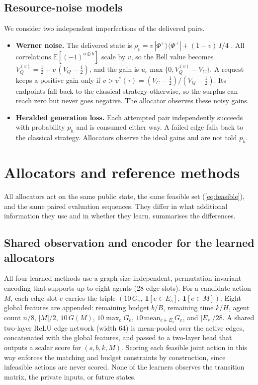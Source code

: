 \documentclass[11pt,a4paper]{article}
\newcommand{\xor}{\mathbin{\oplus}}
\newcommand{\E}{\mathbb{E}}
\begin{document}
\subsection{Resource-noise models}\label{sec:noise-model}

We consider two independent imperfections of the delivered pairs.
\begin{itemize}[leftmargin=*]
  \item \textbf{Werner noise.} The delivered state is $\rho_v=v\,|\Phi^+\rangle\langle\Phi^+|+(1-v)\,I/4$ \cite{werner1989quantum}. All correlations $\E[(-1)^{a\xor b}]$ scale by $v$, so the Bell value becomes $V_Q^{(v)}=\tfrac12+v\,(V_Q-\tfrac12)$, and the gain is $u_e\max\{0,V_Q^{(v)}-V_C\}$. A request keeps a positive gain only if $v>v^*(\tau)=(V_C-\tfrac12)/(V_Q-\tfrac12)$. Its endpoints fall back to the classical strategy otherwise, so the surplus can reach zero but never goes negative. The allocator observes these noisy gains.
  \item \textbf{Heralded generation loss.} Each attempted pair independently succeeds with probability $p_h$ and is consumed either way. A failed edge falls back to the classical strategy. Allocators observe the ideal gains and are not told $p_h$.
\end{itemize}

\section{Allocators and reference methods}\label{sec:methods}

All allocators act on the same public state, the same feasible set (\cref{eq:feasible}), and the same paired evaluation sequences. They differ in what additional information they use and in whether they learn.  summarises the differences.

\subsection{Shared observation and encoder for the learned allocators}\label{sec:features}

All four learned methods use a graph-size-independent, permutation-invariant encoding \cite{zaheer2017deep} that supports up to eight agents (28 edge slots). For a candidate action $M$, each edge slot $e$ carries the triple $(10\,G_e,\ \mathbf{1}[e\in E_{s}],\ \mathbf{1}[e\in M])$. Eight global features are appended: remaining budget $b/B$, remaining time $k/H$, agent count $n/8$, $|M|/2$, $10\,G(M)$, $10\max_{e}G_e$, $10\,\mathrm{mean}_{e\in E_s}G_e$, and $|E_s|/28$. A shared two-layer ReLU edge network (width 64) is mean-pooled over the active edges, concatenated with the global features, and passed to a two-layer head that outputs a scalar score for $(s,b,k,M)$. Scoring each feasible joint action in this way enforces the matching and budget constraints by construction, since infeasible actions are never scored. None of the learners observes the transition matrix, the private inputs, or future states.
\end{document}
